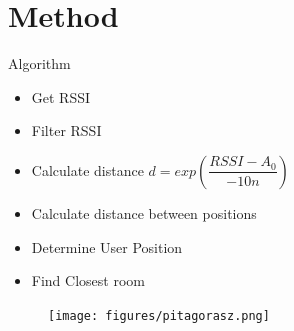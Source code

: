 \documentclass{beamer}
\begin{document}
\section{Method}
\begin{frame}[fragile]{Algorithm}
\begin{minipage}{0.49\textwidth}
\begin{itemize}
	\item Get RSSI
	\item Filter RSSI
	\item Calculate distance 
	 $d=exp(\dfrac{RSSI - A_{0}}{-10n})$
	\item Calculate distance between positions
	\item Determine User Position
	\item Find Closest room
\end{itemize}
\end{minipage}
\begin{minipage}{0.49\textwidth}
\begin{figure}
	\texttt{[image: figures/pitagorasz.png]}
\end{figure}
\end{minipage}
\end{frame}
\end{document}
